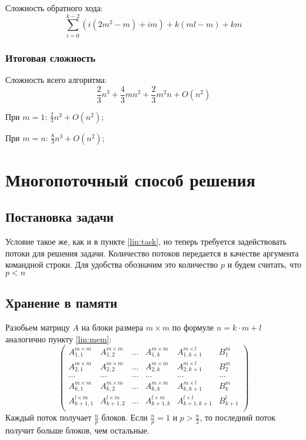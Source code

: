 \documentclass[12pt]{report}
\begin{document}
        Сложность обратного хода:
        \[ \sum^{k-2}_{i=0} (i(2m^2-m) + im) + k(ml - m) + km \]

        \subsection{Итоговая сложность}
        Сложность всего алгоритма: 
        \[\boxed{\frac{2}{3}n^3 + \frac{4}{3}mn^2 + \frac{2}{3}m^2n + O(n^2)} \]

        При $m = 1$: $\frac{2}{3}n^3 + O(n^2)$;

        При $m = n$: $\frac{8}{3}n^3 + O(n^2)$;
    
    \chapter{Многопоточный способ решения}
        \section{Постановка задачи} \label{thread:task}
        Условие такое же, как и в пункте \ref{lin:task}, но теперь требуется задействовать 
        потоки для решения задачи. Количество потоков передается в качестве аргумента командной
        строки. Для удобства обозначим это количество $p$ и будем считать, что $p < n$

        
        \section{Хранение в памяти} \label{thread:mem}
        \quad Разобьем матрицу $A$ на блоки размера $m \times m$ 
        по формуле $ n = k \cdot m + l $ аналогично пункту \ref{lin:mem}:
        \[
        \left(
        \begin{array}{ccccc|c}
            A_{1,1}^{m \times m}   & A_{1,2}^{m \times m}   & \ldots & A_{1,k}^{m \times m}   & A_{1,k+1}^{m \times l}    & B^{m}_{1}   \\
            A_{2,1}^{m \times m}   & A_{2,2}^{m \times m}   & \ldots & A_{2,k}^{m \times m}   & A_{2,k+1}^{m \times l}    & B^{m}_{2}   \\
            \ldots                 & \ldots                 & \ldots & \ldots                 & \ldots                    & \ldots      \\
            A_{k,1}^{m \times m}   & A_{k,2}^{m \times m}   & \ldots & A_{k,k}^{m \times m}   & A_{k,k+1}^{m \times l}    & B^{m}_{k}   \\
            A_{k+1,1}^{l \times m} & A_{k+1,2}^{l \times m} & \ldots & A_{k+1,k}^{l \times m} & A_{k+1, k+1}^{l \times l} & B^{l}_{k+1} \\
        \end{array}
        \right)
        \]
        Каждый поток получает $\frac{n}{p}$ блоков. Если $\frac{n}{p} = 1$ и $p > \frac{n}{2}$, то
        последний поток получит больше блоков, чем остальные.  
\end{document}
